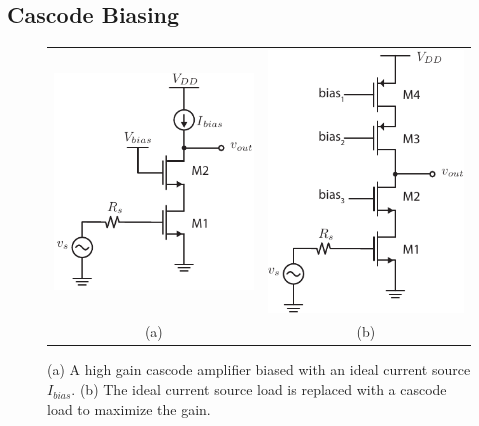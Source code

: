 \subsection{Cascode Biasing}
\begin{figure}[tb]
\begin{center}
\begin{tabular}{cc}
\includegraphics[scale=1]{15cascode_current_source_dc} &
\includegraphics[scale=1]{cascode_current_load_cascode.pdf} \\
(a) & (b) \\
\end{tabular}
\end{center}
\caption{(a) A high gain cascode amplifier biased with an ideal current source $I_{bias}$.  (b) The ideal current source load is replaced with a cascode load to maximize the gain.}  \label{fig:15cascode_current_source_dc}
\end{figure}

